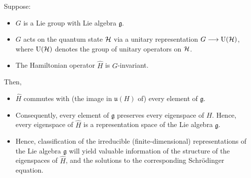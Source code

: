 Suppose:
\begin{itemize}
\item
	$G$ is a Lie group with Lie algebra $\mathfrak{g}$.
\item
	$G$ acts on the quantum state $\mathcal{H}$ via a unitary representation $G \longrightarrow \textnormal{U}(\mathcal{H})$,
	where $\textnormal{U}(\mathcal{H})$ denotes the group of unitary operators on $\mathcal{H}$.
\item
	The Hamiltonian operator $\widehat{H}$ is $G$-invariant.
\end{itemize}
Then,
\begin{itemize}
\item
	$\widehat{H}$ commutes with (the image in $\mathfrak{u}(H)$ of) every element of $\mathfrak{g}$.
\item
	Consequently, every element of $\mathfrak{g}$ preserves every eigenspace of $\widehat{H}$.
	Hence, every eigenspace of $\widehat{H}$ is a representation space of the Lie algebra $\mathfrak{g}$.
\item
	Hence, classification of the irreducible (finite-dimensional) representations of the Lie algebra $\mathfrak{g}$
	will yield valuable information of the structure of the eigenspaces of $\widehat{H}$, and the solutions
	to the corresponding Schr\"{o}dinger equation.
\end{itemize}

